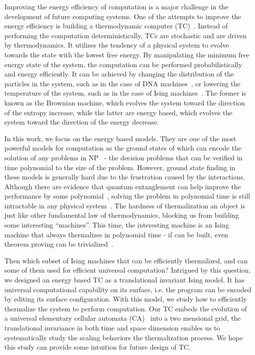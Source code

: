 \documentclass[twocolumn,superscriptaddress,english,showpacs,longbibliography]{revtex4-2}
\begin{document}
Improving the energy efficiency of computation is a major challenge in the development of future computing systems.
One of the attempts to improve the energy efficiency is building a thermodynamic computer (TC)~\cite{conte2019thermodynamic, hylton2021vision}.
Instead of performing the computation deterministically, TCs are stochastic and are driven by thermodynamics.
It utilizes the tendency of a physical system to evolve towards the state with the lowest free energy.
By manipulating the minimum free energy state of the system, the computation can be performed probabilistically and energy efficiently.
It can be achieved by changing the distribution of the particles in the system, such as in the case of DNA machines~\cite{Feynman2018, tanaka2005design}, or lowering the temperature of the system, such as in the case of Ising machines~\cite{boixo2013experimental, gu2012encoding, lucas2014ising, mohseni2022ising, fabre2014optical}.
The former is known as the Brownian machine, which evolves the system toward the direction of the entropy increase, while the latter are energy based, which evolves the system toward the direction of the energy decrease.

In this work, we focus on the energy based models.
They are one of the most powerful models for computation as the ground states of which can encode the solution of any problems in NP~\cite{Moore2011, gu2012encoding, lucas2014ising,mohseni2022ising} - the decision problems that can be verified in time polynomial to the size of the problem.
However, ground state finding in these models is generally hard due to the frustration caused by the interactions.
Although there are evidence that quantum entanglement can help improve the performance by some polynomial~\cite{boixo2014evidence,Grover1992,Pichler2018, Ebadi2022, Nguyen2023}, solving the problem in polynomial time is still intractable in any physical system~\cite{Bernstein1993}.
The hardness of thermalization an object is just like other fundamental law of thermodynamics, blocking us from building some interesting ``machines''.
This time, the interesting machine is an Ising machine that always thermalizes in polynomial time - if can be built, even theorem proving can be trivialized~\cite{Moore2011}.

Then which subset of Ising machines that can be efficiently thermalized, and can some of them used for efficient universal computation?
Intrigued by this question, we designed an energy based TC as a translational invariant Ising model. It has universal computational capability on its surface, i.e. the program can be encoded by editing its surface configuration.
With this model, we study how to efficiently thermalize the system to perform computation.
Our TC embeds the evolution of a universal elementary cellular automata (CA)~\cite{Wolfram1983} into a two mensional grid, the translational invariance in both time and space dimension enables us to systematically study the scaling behaviors the thermalization process.
We hope this study can provide some intuition for future design of TC.
\end{document}
